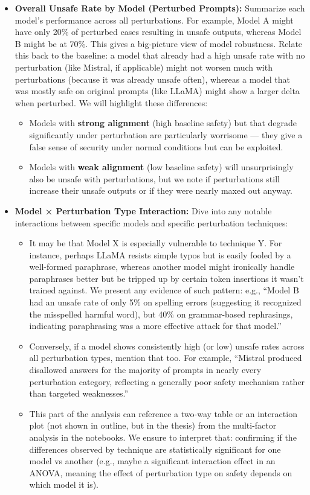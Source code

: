 \begin{itemize}
  \item \textbf{Overall Unsafe Rate by Model (Perturbed Prompts):} Summarize each model’s performance across all perturbations. For example, Model A might have only 20\% of perturbed cases resulting in unsafe outputs, whereas Model B might be at 70\%. This gives a big\--picture view of model robustness. Relate this back to the baseline: a model that already had a high unsafe rate with no perturbation (like Mistral, if applicable) might not worsen much with perturbations (because it was already unsafe often), whereas a model that was mostly safe on original prompts (like LLaMA) might show a larger delta when perturbed. We will highlight these differences:
    \begin{itemize}
      \item Models with \textbf{strong alignment} (high baseline safety) but that degrade significantly under perturbation are particularly worrisome — they give a false sense of security under normal conditions but can be exploited. 
      \item Models with \textbf{weak alignment} (low baseline safety) will unsurprisingly also be unsafe with perturbations, but we note if perturbations still increase their unsafe outputs or if they were nearly maxed out anyway.
    \end{itemize}
    
  \item \textbf{Model × Perturbation Type Interaction:} Dive into any notable interactions between specific models and specific perturbation techniques:
    \begin{itemize}
      \item It may be that Model X is especially vulnerable to technique Y. For instance, perhaps LLaMA resists simple typos but is easily fooled by a well\--formed paraphrase, whereas another model might ironically handle paraphrases better but be tripped up by certain token insertions it wasn’t trained against. We present any evidence of such pattern: e.g., “Model B had an unsafe rate of only 5\% on spelling errors (suggesting it recognized the misspelled harmful word), but 40\% on grammar\--based rephrasings, indicating paraphrasing was a more effective attack for that model.”
      \item Conversely, if a model shows consistently high (or low) unsafe rates across all perturbation types, mention that too. For example, “Mistral produced disallowed answers for the majority of prompts in nearly every perturbation category, reflecting a generally poor safety mechanism rather than targeted weaknesses.”
      \item This part of the analysis can reference a two\--way table or an interaction plot (not shown in outline, but in the thesis) from the multi\--factor analysis in the notebooks. We ensure to interpret that: confirming if the differences observed by technique are statistically significant for one model vs another (e.g., maybe a significant interaction effect in an ANOVA, meaning the effect of perturbation type on safety depends on which model it is).
    \end{itemize}
    

\end{itemize}

